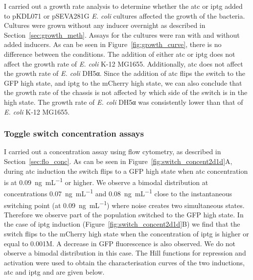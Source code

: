 I carried out a growth rate analysis to determine whether the \acrshort{atc} or \acrshort{iptg} added to pKDL071 or pSEVA281G \textit{E. coli} cultures affected the growth of the bacteria. Cultures were grown without any inducer overnight as described in Section~\ref{sec:growth_meth}. Assays for the cultures were ran with and without added inducers. As can be seen in Figure~\ref{fig:growth_curve}, there is no difference between the conditions. The addition of either \acrshort{atc} or \acrshort{iptg} does not affect the growth rate of \textit{E. coli} K-12 MG1655. Additionally, \acrshort{atc} does not affect the growth rate of \textit{E. coli} DH5α. Since the addition of \acrshort{atc} flips the switch to the GFP high state, and \acrshort{iptg} to the mCherry high state, we can also conclude that the growth rate of the chassis is not affected by which side of the switch is in the high state. The growth rate of \textit{E. coli} DH5α was consistently lower than that of \textit{E. coli} K-12 MG1655. 




\subsubsection{Toggle switch concentration assays}

I carried out a concentration assay using flow cytometry, as described in Section~\ref{sec:flo_conc}. As can be seen in Figure~\ref{fig:switch_concent2d1d}A, during \acrshort{atc} induction the switch flips to a GFP high state when \acrshort{atc} concentration is at \SI{0.09}{\nano\gram\per\milli\liter} or higher. We observe a bimodal distribution at concentrations \SI{0.07}{\nano\gram\per\milli\liter} and \SI{0.08}{\nano\gram\per\milli\liter} close to the instantaneous switching point (at \SI{0.09}{\nano\gram\per\milli\liter}) where noise creates two simultaneous states. Therefore we observe part of the population switched to the GFP high state. In the case of \acrshort{iptg} induction (Figure~\ref{fig:switch_concent2d1d}B) we find that the switch flips to the mCherry high state when the concentration of \acrshort{iptg} is higher or equal to 0.001M. A decrease in GFP fluorescence is also observed. We do not observe a bimodal distribution in this case. The Hill functions for repression and activation were used to obtain the characterisation curves of the two inductions, \acrshort{atc} and \acrshort{iptg} and are given below. 

